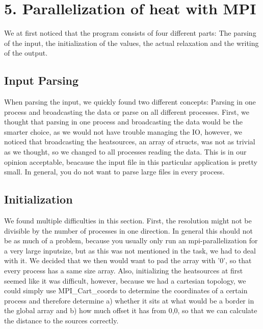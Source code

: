 \section*{5. Parallelization of heat with MPI}

We at first noticed that the program consists of four different parts: The parsing of the input, the initialization of the values, the actual relaxation and the writing of the output.

\subsection*{Input Parsing}

When parsing the input, we quickly found two different concepts: Parsing in one process and broadcasting the data or parse on all different processes.
First, we thought that parsing in one process and broadcasting the data would be the smarter choice, as we would not have trouble managing the IO, however, we noticed that broadcasting the heatsources, an array of structs, was not as trivial as we thought, so we changed to all processes reading the data. This is in our opinion acceptable, beacause the input file in this particular application is pretty small. In general, you do not want to parse large files in every process.

\subsection*{Initialization}




We found multiple difficulties in this section. First, the resolution might not be divisible by the number of processes in one direction. In general this should not be as much of a problem, because you usually only run an mpi-parallelization for a very large inputsize, but as this was not mentioned in the task, we had to deal with it. We decided that we then would want to pad the array with '0', so that every process has a same size array. Also, initializing the heatsources at first seemed like it was difficult, however, because we had a cartesian topology, we could simply use MPI\_Cart\_coords to determine the coordinates of a certain process and therefore determine a) whether it sits at what would be a border in the global array and b) how much offset it has from 0,0, so that we can calculate the distance to the sources correctly.




